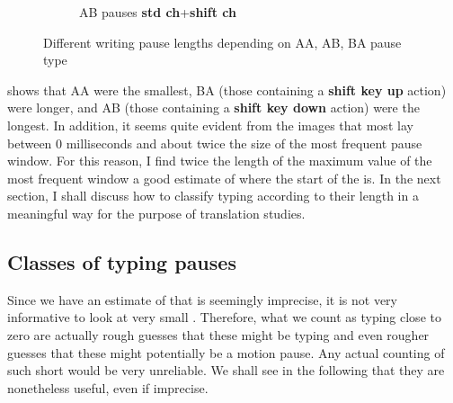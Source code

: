 \documentclass[output=paper]{LSP/langsci}
\begin{document}
\begin{figure}
\begin{subfigure}[b]{0.33\textwidth}
                \caption{AB pauses \textbf{std ch}+\textbf{shift ch}}
                \label{fig:tiger}
        \end{subfigure}%
        \caption{Different writing pause lengths depending on AA, AB, BA pause type}
        \label{couto:fig:WritingPauses}
\end{figure}

 shows that AA  were the smallest, BA  (those containing a \textbf{shift key up} action) were longer, and AB  (those containing a \textbf{shift key down} action) were the longest. In addition, it seems quite evident from the images that most  lay between 0 milliseconds and about twice the size of the most frequent pause window. For this reason, I find twice the length of the maximum value of the most frequent window a good estimate of where the start of the  is. In the next section, I shall discuss how to classify typing  according to their length in a meaningful way for the purpose of translation studies.

\largerpage[-1]
\subsection{Classes of typing pauses}
\label{couto:sec:ClassesOfTypingPauses}

Since we have an estimate of  that is seemingly imprecise, it is not very informative to look at very small . Therefore, what we count as typing  close to zero are actually rough guesses that these might be typing  and even rougher guesses that these might potentially be a motion pause. Any actual counting of such short  would be very unreliable. We shall see in the following that they are nonetheless useful, even if imprecise.
\end{document}
